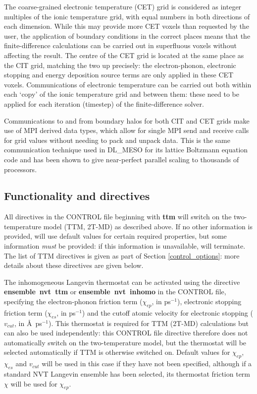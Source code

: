 The coarse-grained electronic temperature (CET) grid is considered as 
integer multiples of the ionic temperature grid, with equal numbers in both 
directions of each dimension. While this may provide more CET voxels than 
requested by the user, the application of boundary conditions in the correct
places means that the finite-difference calculations can be carried out in 
superfluous voxels without affecting the result. The centre of the CET grid is 
located at the same place as the CIT grid, matching the two up precisely: the 
electron-phonon, electronic stopping and energy deposition source terms are 
only applied in these CET voxels. Communications of electronic temperature 
can be carried out both within each `copy' of the ionic temperature grid and 
between them: these need to be applied for each iteration (timestep) of the 
finite-difference solver.

Communications to and from boundary halos for both CIT and CET grids 
make use of MPI derived data types, which allow for single MPI send and 
receive calls for grid values without needing to pack and unpack data. This 
is the same communication technique used in DL\_MESO for its lattice 
Boltzmann equation code\cite{seaton-13a} and has been shown to give 
near-perfect parallel scaling to thousands of processors.

\subsection*{Functionality and directives}

All directives in the CONTROL file beginning with {\bf ttm} will switch on 
the two-temperature model (TTM, 2T-MD) as described above. If no other 
information is provided, \D will use default values for certain required 
properties, but some information {\em must} be provided: if this information 
is unavailable, \D will terminate. The list of TTM directives is given as part of 
Section \ref{control_options}: more details about these directives are given 
below.

The inhomogeneous Langevin thermostat can be activated using the 
directive {\bf ensemble~nvt~ttm} or {\bf ensemble~nvt~inhomo} in the 
CONTROL file, specifying the electron-phonon friction term ($\chi_{ep}$, 
in ps$^{-1}$), electronic stopping friction term ($\chi_{es}$, in ps$^{-1}$) 
and the cutoff atomic velocity for electronic stopping ($v_{cut}$, in 
\AA~ps$^{-1}$). This thermostat is required for TTM (2T-MD) calculations 
but can also be used independently: this CONTROL file directive therefore 
does not automatically switch on the two-temperature model, but the 
thermostat will be selected automatically if TTM is otherwise switched on. 
Default values for $\chi_{ep}$, $\chi_{es}$ and $v_{cut}$ will be used in this 
case if they have not been specified, although if a standard NVT Langevin 
ensemble has been selected, its thermostat friction term $\chi$ will be used 
for $\chi_{ep}$. 

